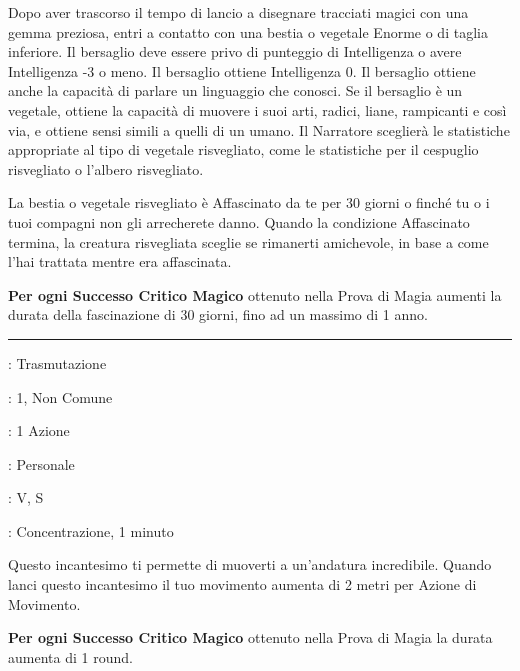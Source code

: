 \begin{multicols}{2}
Dopo aver trascorso il tempo di lancio a disegnare tracciati magici con una gemma preziosa, entri a contatto con una bestia o vegetale Enorme o di taglia inferiore. Il bersaglio deve essere privo di punteggio di Intelligenza o avere Intelligenza -3 o meno. Il bersaglio ottiene Intelligenza 0. Il bersaglio ottiene anche la capacità di parlare un linguaggio che conosci. Se il bersaglio è un vegetale, ottiene la capacità di muovere i suoi arti, radici, liane, rampicanti e così via, e ottiene sensi simili a quelli di un umano. Il Narratore sceglierà le statistiche appropriate al tipo di vegetale risvegliato, come le statistiche per il cespuglio risvegliato o l'albero risvegliato.

La bestia o vegetale risvegliato è Affascinato da te per 30 giorni o finché tu o i tuoi compagni non gli arrecherete danno. Quando la condizione Affascinato termina, la creatura risvegliata sceglie se rimanerti amichevole, in base a come l'hai trattata mentre era affascinata.

\textbf{Per ogni Successo Critico Magico} ottenuto nella Prova di Magia aumenti la durata della fascinazione di 30 giorni, fino ad un massimo di 1 anno.

\smallskip\noindent\rule{\linewidth}{2pt} \hypertarget{Ritirata Rapida}{}\smallskip{}
\noindent
\begin{description}[noitemsep, topsep=0pt, parsep=0pt, partopsep=0pt, leftmargin=0cm, labelwidth=2.8cm]
	\item[\textbf{Lista di Magia}]: Trasmutazione
	\item[\textbf{Livello}]: 1, Non Comune
	\item[\textbf{T. di Lancio}]: 1 Azione
	\item[\textbf{Gittata}]: Personale
	\item[\textbf{Componenti}]: V, S
	\item[\textbf{Durata}]: Concentrazione, 1 minuto
\end{description}

Questo incantesimo ti permette di muoverti a un'andatura incredibile. Quando lanci questo incantesimo il tuo movimento aumenta di 2 metri per Azione di Movimento.

\textbf{Per ogni Successo Critico Magico} ottenuto nella Prova di Magia la durata aumenta di 1 round.


\end{multicols}
